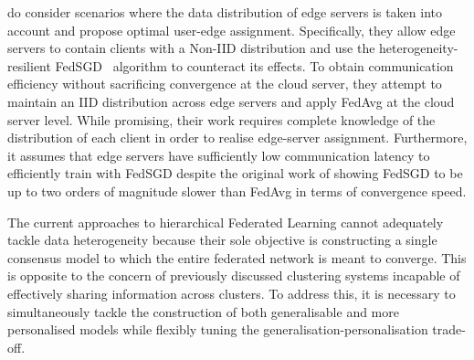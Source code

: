 \citet{OptimalUserEdgeAssingmentHierFL} do consider scenarios where the data distribution of edge servers is taken into account and propose optimal user-edge assignment. Specifically, they allow edge servers to contain clients with a Non-IID distribution and use the heterogeneity-resilient FedSGD~\citep{FedAvg} algorithm to counteract its effects. To obtain communication efficiency without sacrificing convergence at the cloud server, they attempt to maintain an IID distribution across edge servers and apply FedAvg at the cloud server level. While promising, their work requires complete knowledge of the distribution of each client in order to realise edge-server assignment. Furthermore, it assumes that edge servers have sufficiently low communication latency to efficiently train with FedSGD despite the original work of \citet{FedAvg} showing FedSGD to be up to two orders of magnitude slower than FedAvg in terms of convergence speed.

The current approaches to hierarchical Federated Learning cannot adequately tackle data heterogeneity because their sole objective is constructing a single consensus model to which the entire federated network is meant to converge. This is opposite to the concern of previously discussed clustering systems incapable of effectively sharing information across clusters. To address this, it is necessary to simultaneously tackle the construction of both generalisable and more personalised models while flexibly tuning the generalisation-personalisation trade-off.


